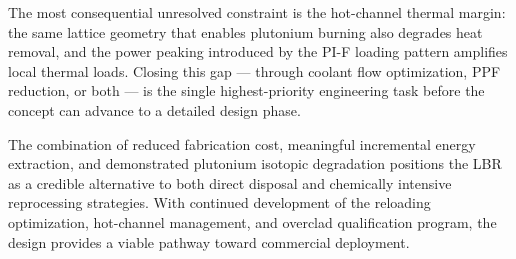 The most consequential unresolved constraint is the hot-channel thermal
margin: the same lattice geometry that enables plutonium burning also
degrades heat removal, and the power peaking introduced by the PI-F loading
pattern amplifies local thermal loads. Closing this gap --- through coolant
flow optimization, PPF reduction, or both --- is the single highest-priority
engineering task before the concept can advance to a detailed design phase.

The combination of reduced fabrication cost, meaningful incremental energy
extraction, and demonstrated plutonium isotopic degradation positions the LBR
as a credible alternative to both direct disposal and chemically intensive
reprocessing strategies. With continued development of the reloading
optimization, hot-channel management, and overclad qualification program, the
design provides a viable pathway toward commercial deployment.
